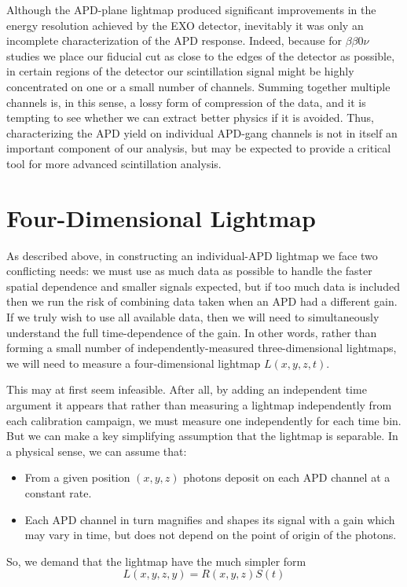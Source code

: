 Although the APD-plane lightmap produced significant improvements in the energy resolution achieved by the EXO detector, inevitably it was only an incomplete characterization of the APD response.  Indeed, because for $\beta\beta0\nu$ studies we place our fiducial cut as close to the edges of the detector as possible, in certain regions of the detector our scintillation signal might be highly concentrated on one or a small number of channels.  Summing together multiple channels is, in this sense, a lossy form of compression of the data, and it is tempting to see whether we can extract better physics if it is avoided.  Thus, characterizing the APD yield on individual APD-gang channels is not in itself an important component of our analysis, but may be expected to provide a critical tool for more advanced scintillation analysis.

\section{Four-Dimensional Lightmap}

As described above, in constructing an individual-APD lightmap we face two conflicting needs: we must use as much data as possible to handle the faster spatial dependence and smaller signals expected, but if too much data is included then we run the risk of combining data taken when an APD had a different gain.  If we truly wish to use all available data, then we will need to simultaneously understand the full time-dependence of the gain.  In other words, rather than forming a small number of independently-measured three-dimensional lightmaps, we will need to measure a four-dimensional lightmap $L(x,y,z,t)$.

This may at first seem infeasible.  After all, by adding an independent time argument it appears that rather than measuring a lightmap independently from each calibration campaign, we must measure one independently for each time bin.  But we can make a key simplifying assumption that the lightmap is separable.  In a physical sense, we can assume that:
\begin{itemize}
\item From a given position $(x,y,z)$ photons deposit on each APD channel at a constant rate.
\item Each APD channel in turn magnifies and shapes its signal with a gain which may vary in time, but does not depend on the point of origin of the photons.
\end{itemize}
So, we demand that the lightmap have the much simpler form
\begin{equation}
L(x,y,z,y) = R(x,y,z)S(t)
\end{equation}

